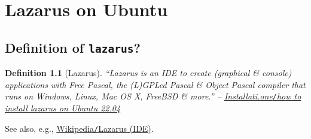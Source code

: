 \documentclass[oneside]{book}
\numberwithin{equation}{section}
\newtheorem{definition}{Definition}[section]
\begin{document}
\chapter{Lazarus on Ubuntu}

\section{Definition of \texttt{lazarus}?}

\begin{definition}[Lazarus]
	``\emph{Lazarus} is an IDE to create (graphical \& console) applications with Free Pascal, the (L)GPLed Pascal \& Object Pascal compiler that runs on Windows, Linux, Mac OS X, FreeBSD \& more.'' -- \href{https://installati.one/ubuntu/22.04/lazarus/}{Installati.one\emph{\texttt{/}}how to install lazarus on Ubuntu 22.04}
\end{definition}
See also, e.g., \href{https://vi.wikipedia.org/wiki/Lazarus_(IDE)}{Wikipedia\texttt{/}Lazarus (IDE)}.


\printbibliography[heading=bibintoc]
	
\end{document}
